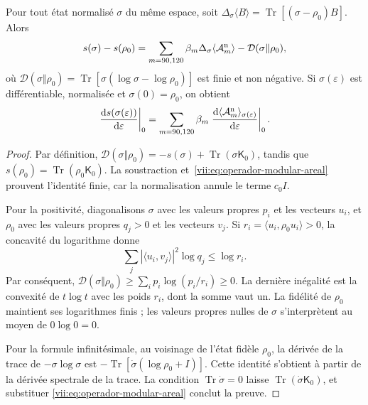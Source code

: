 \begin{theorem}
\label{vii:thm:ley-modular-finita}
Pour tout état normalisé \(\sigma\) du même espace, soit
\(\Delta_\sigma\langle B\rangle
=\operatorname{Tr}[(\sigma-\rho_0)B]\). Alors
\begin{equation}
 s(\sigma)-s(\rho_0)
 =\sum_{m=90,120}\beta_m\Delta_\sigma\langle\mathcal A_m^{\rm n}\rangle
  -\mathcal D(\sigma\Vert\rho_0),
 \label{vii:eq:ley-modular-finita}
\end{equation}
où
\(\mathcal D(\sigma\Vert\rho_0)
=\operatorname{Tr}[\sigma(\log\sigma-\log\rho_0)]\)
est finie et non négative. Si \(\sigma(\varepsilon)\) est différentiable,
normalisée et \(\sigma(0)=\rho_0\), on obtient
\begin{equation}
 \left.\frac{\mathrm ds(\sigma(\varepsilon))}{\mathrm d\varepsilon}\right|_0
 =\sum_{m=90,120}\beta_m
   \left.\frac{\mathrm d\langle\mathcal A_m^{\rm n}\rangle_{
                 \sigma(\varepsilon)}}{\mathrm d\varepsilon}\right|_0.
 \label{vii:eq:primera-ley-modular}
\end{equation}
\end{theorem}
\begin{proof}
Par définition,
\(\mathcal D(\sigma\Vert\rho_0)=-s(\sigma)
+\operatorname{Tr}(\sigma\mathsf K_0)\), tandis que
\(s(\rho_0)=\operatorname{Tr}(\rho_0\mathsf K_0)\).
La soustraction et~\eqref{vii:eq:operador-modular-areal} prouvent l'identité
finie, car la normalisation annule le terme \(c_0I\).

Pour la positivité, diagonalisons \(\sigma\) avec les valeurs propres \(p_i\) et les vecteurs \(u_i\), et \(\rho_0\) avec les valeurs propres \(q_j>0\) et les vecteurs \(v_j\). Si \(r_i=\langle u_i,\rho_0u_i\rangle>0\), la concavité du logarithme donne
\[
 \sum_j|\langle u_i,v_j\rangle|^2\log q_j\le\log r_i.
\]
Par conséquent,
\(\mathcal D(\sigma\Vert\rho_0)
\ge\sum_i p_i\log(p_i/r_i)\ge0\).
La dernière inégalité est la convexité de \(t\log t\) avec les poids
\(r_i\), dont la somme vaut un. La fidélité de \(\rho_0\) maintient
ses logarithmes finis ; les valeurs propres nulles de \(\sigma\)
s'interprètent au moyen de \(0\log0=0\).

Pour la formule infinitésimale, au voisinage de l'état fidèle \(\rho_0\),
la dérivée de la trace de \(-\sigma\log\sigma\) est
\(-\operatorname{Tr}[\dot\sigma(\log\rho_0+I)]\).
Cette identité s'obtient à partir de la dérivée spectrale de la trace.
La condition \(\operatorname{Tr}\dot\sigma=0\) laisse
\(\operatorname{Tr}(\dot\sigma\mathsf K_0)\), et substituer
\eqref{vii:eq:operador-modular-areal} conclut la preuve.
\end{proof}


